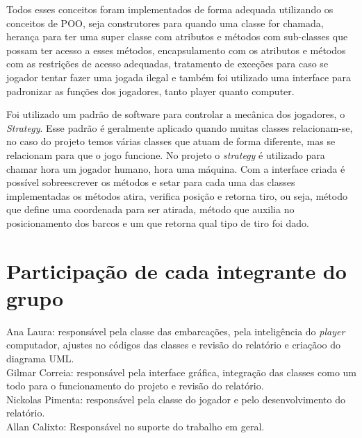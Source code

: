\documentclass[]{article}
\begin{document}
Todos esses conceitos foram implementados de forma adequada utilizando os conceitos de POO, seja construtores para quando uma classe for chamada, herança para ter uma super classe com atributos e métodos com sub-classes que possam ter acesso a esses métodos, encapsulamento com os atributos e métodos com as restrições de acesso adequadas, tratamento de exceções para caso se jogador tentar fazer uma jogada ilegal e também foi utilizado uma interface para padronizar as funções dos jogadores, tanto player quanto computer.

Foi utilizado um padrão de software para controlar a mecânica dos jogadores, o  \textit{Strategy}. Esse padrão é geralmente aplicado quando muitas classes relacionam-se, no caso do projeto temos várias classes que atuam de forma diferente, mas se relacionam para que o jogo funcione. No projeto o \textit{strategy} é utilizado para chamar hora um jogador humano, hora uma máquina. Com a interface criada é possível sobreescrever os métodos e setar para cada uma das classes implementadas os métodos atira, verifica posição e retorna tiro, ou seja, método que define uma coordenada para ser atirada, método que auxilia no posicionamento dos barcos e um que retorna qual tipo de tiro foi dado.

\section{Participação de cada integrante do grupo}

Ana Laura: responsável pela classe das embarcações, pela inteligência do \textit{player} computador, ajustes no códigos das classes e revisão do relatório e criaçãoo do diagrama UML.
\\
Gilmar Correia: responsável pela interface gráfica, integração das classes como um todo para o funcionamento do projeto e revisão do relatório.
\\
Nickolas Pimenta: responsável pela classe do jogador e pelo desenvolvimento do relatório.
\\
Allan Calixto: Responsável no suporte do trabalho em geral.
\end{document}
